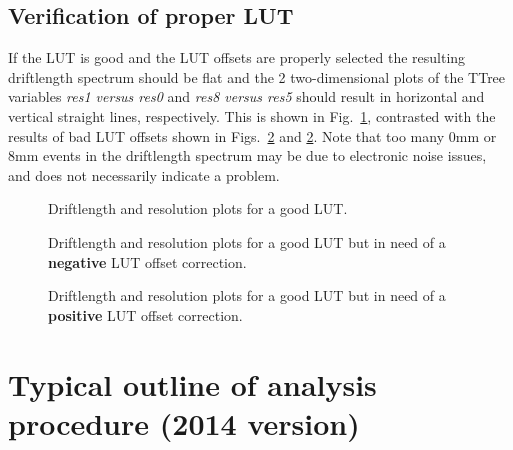 \documentclass[11pt]{report}
\begin{document}
\newpage
\subsection{Verification of proper LUT}\label{sec:LUTverification}

If the LUT is good and the LUT offsets are properly selected
the resulting driftlength spectrum should be flat
and the 2 two-dimensional plots of the TTree variables {\it res1 versus res0}
and {\it res8 versus res5}
should result in horizontal and vertical straight lines, respectively.
This is shown in Fig.~\ref{fig:resplots-good}, contrasted with the results of 
bad LUT offsets shown in Figs.~\ref{fig:resplots-bad} and \ref{fig:resplots-bad}.
%
Note that too many 0mm or 8mm  events in the driftlength spectrum
may be due to electronic noise issues, and does not necessarily
indicate a problem.

\begin{figure}
\centerline{\vspace{0cm}\hspace{0cm}
}
\centering
\caption{Driftlength and resolution plots for a good LUT.}
\label{fig:resplots-good}
\end{figure} 

\begin{figure}
\centerline{\vspace{0cm}\hspace{0cm}
}
\centering
\caption{Driftlength and resolution plots for a good LUT but in need of a 
{\bf negative} LUT offset correction.}
\label{fig:resplots-bad}
\end{figure} 

\begin{figure}
\centerline{\vspace{0cm}\hspace{0cm}
}
\centering
\caption{Driftlength and resolution plots for a good LUT but in need of a 
{\bf positive} LUT offset correction.}
\label{fig:resplots-bad2}
\end{figure} 






\section{Typical outline of analysis procedure (2014 version)}
\end{document}
